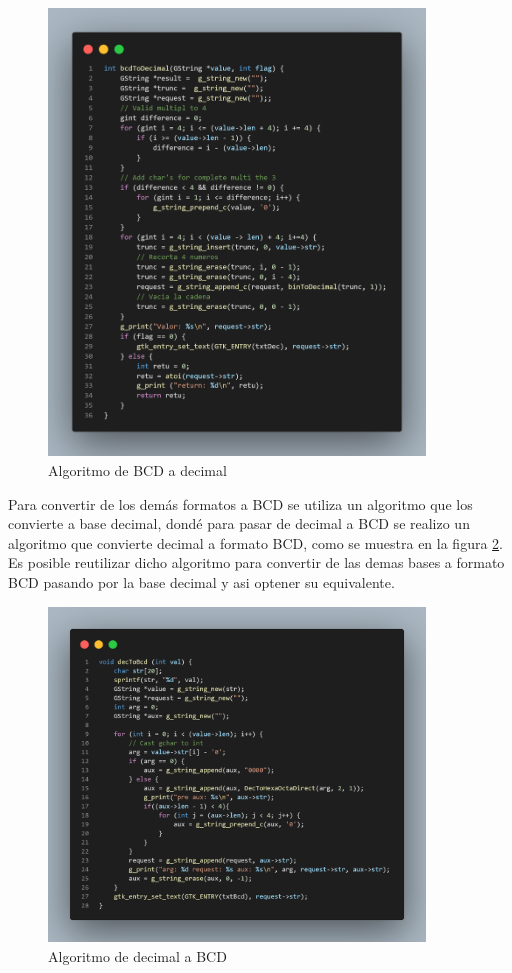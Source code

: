 \documentclass[letterpaper,12pt]{extarticle}%
\begin{document}
			\begin{figure}[H]
			\begin{center}
			\includegraphics[width=10cm]{imag//algBcdToDec.png}
			\caption{Algoritmo de BCD a decimal}
			\label{algBcdToDec}
			\end{center}
			\end{figure}

			Para convertir de los demás formatos a BCD se utiliza un algoritmo que los convierte a base decimal, dondé  para 
			pasar de decimal a BCD se realizo un algoritmo que convierte decimal a formato BCD, como se muestra en la figura 
			\ref{decToBcd}. Es posible reutilizar dicho algoritmo para convertir de las demas bases a formato BCD pasando por
			la base decimal y asi optener su equivalente. 

			\begin{figure}[H]
			\begin{center}
			\includegraphics[width=10cm]{imag//algDecToBcd.png}
			\caption{Algoritmo de decimal a BCD}
			\label{decToBcd}
			\end{center}
			\end{figure}
	
\end{document}
